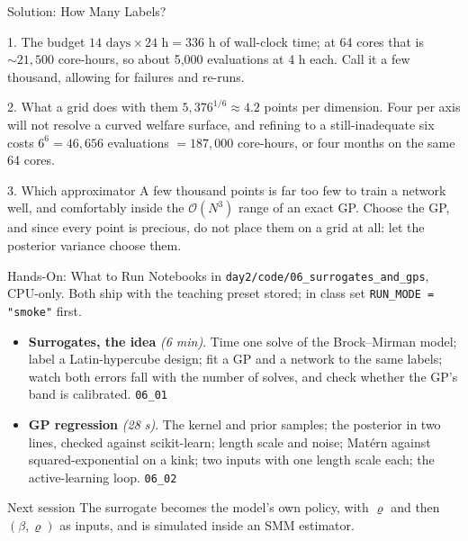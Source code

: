 \documentclass[aspectratio=169,11pt]{beamer}
\newcommand{\emphc}[1]{\textcolor{harvardcrimson}{#1}}
\begin{document}
\begin{frame}{Solution: How Many Labels?}
\small
\begin{block}{1. The budget}
$14 \text{ days} \times 24 \text{ h} = 336$ h of wall-clock time; at 64 cores that is ${\sim}21{,}500$ core-hours, so about \emphc{5{,}000 evaluations} at 4 h each. Call it a few thousand, allowing for failures and re-runs.
\end{block}

\begin{block}{2. What a grid does with them}
$5{,}376^{1/6} \approx 4.2$ points per dimension. Four per axis will not resolve a curved welfare surface, and refining to a still-inadequate six costs $6^6 = 46{,}656$ evaluations $= 187{,}000$ core-hours, or \emphc{four months} on the same 64 cores.
\end{block}

\begin{block}{3. Which approximator}
A few thousand points is far too few to train a network well, and comfortably inside the $\mathcal{O}(N^3)$ range of an exact GP. \emphc{Choose the GP}, and since every point is precious, do not place them on a grid at all: let the posterior variance choose them.
\end{block}
\end{frame}

\begin{frame}{Hands-On: What to Run}
\small
Notebooks in \texttt{day2/code/06\_surrogates\_and\_gps}, CPU-only. Both ship with the teaching preset stored; in class set \texttt{RUN\_MODE = "smoke"} first.

\vspace{0.2cm}
\begin{itemize}\itemsep5pt
  \item \textbf{Surrogates, the idea} \emph{(6 min)}. Time one solve of the Brock--Mirman model; label a Latin-hypercube design; fit a GP and a network to the same labels; watch both errors fall with the number of solves, and check whether the GP's band is calibrated. \hfill{\footnotesize\texttt{06\_01}}
  \item \textbf{GP regression} \emph{(28 s)}. The kernel and prior samples; the posterior in two lines, checked against scikit-learn; length scale and noise; Matérn against squared-exponential on a kink; two inputs with one length scale each; the active-learning loop. \hfill{\footnotesize\texttt{06\_02}}
\end{itemize}

\vspace{0.3cm}
\begin{block}{Next session}
The surrogate becomes the model's own policy, with $\varrho$ and then $(\beta, \varrho)$ as inputs, and is simulated inside an SMM estimator.
\end{block}
\end{frame}
\end{document}
